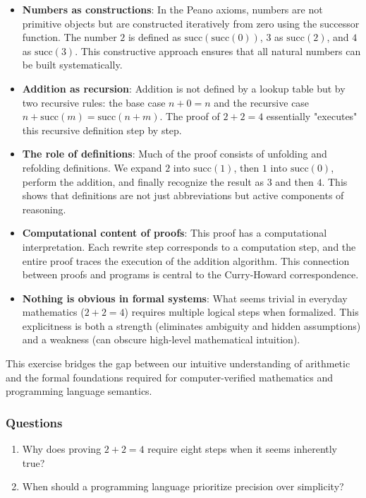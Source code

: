 \documentclass{article}
\theoremstyle{theorem}
\theoremstyle{definition}
\theoremstyle{remark}
\begin{document}
\begin{itemize}
\item \textbf{Numbers as constructions}: In the Peano axioms, numbers are not primitive objects but are constructed iteratively from zero using the successor function. The number $2$ is defined as $\text{succ}(\text{succ}(0))$, $3$ as $\text{succ}(2)$, and $4$ as $\text{succ}(3)$. This constructive approach ensures that all natural numbers can be built systematically.

\item \textbf{Addition as recursion}: Addition is not defined by a lookup table but by two recursive rules: the base case $n + 0 = n$ and the recursive case $n + \text{succ}(m) = \text{succ}(n + m)$. The proof of $2 + 2 = 4$ essentially "executes" this recursive definition step by step.

\item \textbf{The role of definitions}: Much of the proof consists of unfolding and refolding definitions. We expand $2$ into $\text{succ}(1)$, then $1$ into $\text{succ}(0)$, perform the addition, and finally recognize the result as $3$ and then $4$. This shows that definitions are not just abbreviations but active components of reasoning.

\item \textbf{Computational content of proofs}: This proof has a computational interpretation. Each rewrite step corresponds to a computation step, and the entire proof traces the execution of the addition algorithm. This connection between proofs and programs is central to the Curry-Howard correspondence.

\item \textbf{Nothing is obvious in formal systems}: What seems trivial in everyday mathematics ($2 + 2 = 4$) requires multiple logical steps when formalized. This explicitness is both a strength (eliminates ambiguity and hidden assumptions) and a weakness (can obscure high-level mathematical intuition).
\end{itemize}

This exercise bridges the gap between our intuitive understanding of arithmetic and the formal foundations required for computer-verified mathematics and programming language semantics.

\subsubsection{Questions}

\begin{enumerate}
\item Why does proving $2 + 2 = 4$ require eight steps when it seems inherently true?

\item When should a programming language prioritize precision over simplicity?
\end{enumerate}
\end{document}
